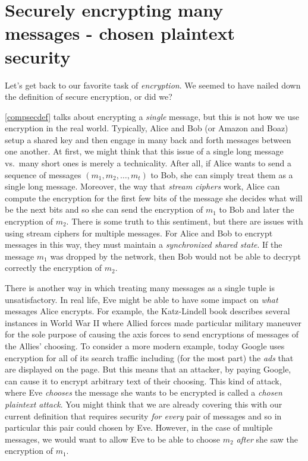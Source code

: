 \section{Securely encrypting many messages - chosen plaintext
security}\label{5-Securely-encrypting-ma}

Let's get back to our favorite task of \emph{encryption}. We seemed to
have nailed down the definition of secure encryption, or did we?


\cref{compsecdef} talks about encrypting a \emph{single} message, but
this is not how we use encryption in the real world. Typically, Alice
and Bob (or Amazon and Boaz) setup a shared key and then engage in many
back and forth messages between one another. At first, we might think
that this issue of a single long message vs.~many short ones is merely a
technicality. After all, if Alice wants to send a sequence of messages
\((m_1,m_2,\ldots,m_t)\) to Bob, she can simply treat them as a single
long message. Moreover, the way that \emph{stream ciphers} work, Alice
can compute the encryption for the first few bits of the message she
decides what will be the next bits and so she can send the encryption of
\(m_1\) to Bob and later the encryption of \(m_2\). There is some truth
to this sentiment, but there are issues with using stream ciphers for
multiple messages. For Alice and Bob to encrypt messages in this way,
they must maintain a \emph{synchronized shared state}. If the message
\(m_1\) was dropped by the network, then Bob would not be able to
decrypt correctly the encryption of \(m_2\).

There is another way in which treating many messages as a single tuple
is unsatisfactory. In real life, Eve might be able to have some impact
on \emph{what} messages Alice encrypts. For example, the Katz-Lindell
book describes several instances in World War II where Allied forces
made particular military maneuver for the sole purpose of causing the
axis forces to send encryptions of messages of the Allies' choosing. To
consider a more modern example, today Google uses encryption for all of
its search traffic including (for the most part) the \emph{ads} that are
displayed on the page. But this means that an attacker, by paying
Google, can cause it to encrypt arbitrary text of their choosing. This
kind of attack, where Eve \emph{chooses} the message she wants to be
encrypted is called a \emph{chosen plaintext attack}. You might think
that we are already covering this with our current definition that
requires security \emph{for every} pair of messages and so in particular
this pair could chosen by Eve. However, in the case of multiple
messages, we would want to allow Eve to be able to choose \(m_2\)
\emph{after} she saw the encryption of \(m_1\).

